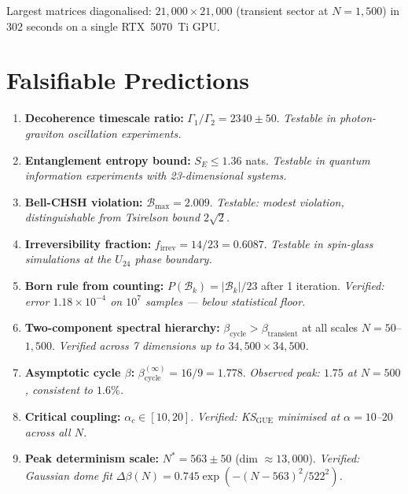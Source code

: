 \documentclass[12pt,a4paper]{article}
\theoremstyle{definition}
\theoremstyle{remark}
\newcommand{\Basin}{\mathcal{B}}
\begin{document}
Largest matrices diagonalised: $21{,}000 \times 21{,}000$ (transient sector at
$N = 1{,}500$) in 302 seconds on a single RTX~5070~Ti GPU.

\section{Falsifiable Predictions}
\label{sec:predictions}

\begin{enumerate}
  \item \textbf{Decoherence timescale ratio:} $\Gamma_1/\Gamma_2 = 2340 \pm 50$.
  \emph{Testable in photon-graviton oscillation experiments.}

  \item \textbf{Entanglement entropy bound:} $S_E \leq 1.36$ nats.
  \emph{Testable in quantum information experiments with 23-dimensional systems.}

  \item \textbf{Bell-CHSH violation:} $\mathcal{B}_{\max} = 2.009$.
  \emph{Testable: modest violation, distinguishable from Tsirelson bound $2\sqrt{2}$.}

  \item \textbf{Irreversibility fraction:} $f_{\text{irrev}} = 14/23 = 0.6087$.
  \emph{Testable in spin-glass simulations at the $U_{24}$ phase boundary.}

  \item \textbf{Born rule from counting:} $P(\Basin_k) = |\Basin_k|/23$ after 1
  iteration. \emph{Verified: error $1.18 \times 10^{-4}$ on $10^7$ samples --- below statistical floor.}

  \item \textbf{Two-component spectral hierarchy:}
  $\beta_{\text{cycle}} > \beta_{\text{transient}}$ at all scales $N = 50$--$1{,}500$.
  \emph{Verified across 7 dimensions up to $34{,}500 \times 34{,}500$.}

  \item \textbf{Asymptotic cycle $\beta$:} $\beta_{\text{cycle}}^{(\infty)} = 16/9 = 1.778$.
  \emph{Observed peak: $1.75$ at $N = 500$, consistent to $1.6\%$.}

  \item \textbf{Critical coupling:} $\alpha_c \in [10, 20]$.
  \emph{Verified: KS$_{\text{GUE}}$ minimised at $\alpha = 10$--$20$ across all $N$.}

  \item \textbf{Peak determinism scale:} $N^* = 563 \pm 50$ (dim $\approx 13{,}000$).
  \emph{Verified: Gaussian dome fit $\Delta\beta(N) = 0.745 \exp(-(N-563)^2/522^2)$.}


\end{enumerate}
\end{document}
